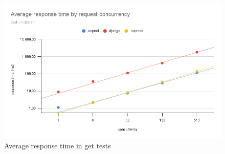 \begin{figure}[H]
    \includegraphics[width=\columnwidth]{figures/pictures/resultsGet.png}
    \caption{Average response time in get tests}
    \label{fig:resultsGet}
\end{figure}

